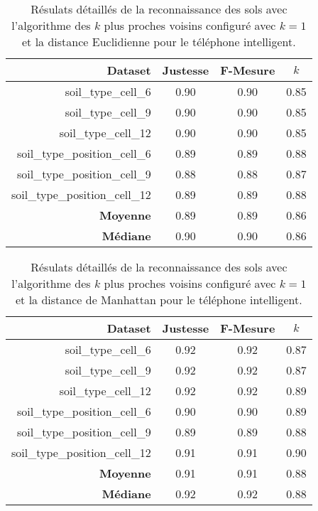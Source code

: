 \begin{table}[H]\renewcommand{\arraystretch}{0.5}
	\centering
	\caption{Résulats détaillés de la reconnaissance des sols avec l'algorithme des $k$ plus proches voisins configuré avec $k=1$ et la distance Euclidienne pour le téléphone intelligent.}
	\label{tab:tab:knn-dE-cell}
	\begin{tabular}{@{}rccc@{}}
		\toprule
			\textbf{Dataset} & \textbf{Justesse} & \textbf{F-Mesure} & \textbf{$k$} \\
		\midrule
			soil\_type\_cell\_6 & 0.90 & 0.90 & 0.85 \\
			soil\_type\_cell\_9 & 0.90 & 0.90 & 0.85 \\
			soil\_type\_cell\_12 & 0.90 & 0.90 & 0.85 \\
			soil\_type\_position\_cell\_6 & 0.89 & 0.89 & 0.88 \\
			soil\_type\_position\_cell\_9 & 0.88 & 0.88 & 0.87 \\
			soil\_type\_position\_cell\_12 & 0.89 & 0.89 & 0.88 \\
			\textbf{Moyenne} & 0.89 & 0.89 & 0.86 \\
			\textbf{Médiane} & 0.90 & 0.90 & 0.86 \\
		\bottomrule
	\end{tabular}
\end{table}

\begin{table}[H]\renewcommand{\arraystretch}{0.5}
	\centering
	\caption{Résulats détaillés de la reconnaissance des sols avec l'algorithme des $k$ plus proches voisins configuré avec $k=1$ et la distance de Manhattan pour le téléphone intelligent.}
	\label{tab:tab:knn-dM-cell}
	\begin{tabular}{@{}rccc@{}}
		\toprule
			\textbf{Dataset} & \textbf{Justesse} & \textbf{F-Mesure} & \textbf{$k$} \\
		\midrule
			soil\_type\_cell\_6 & 0.92 & 0.92 & 0.87 \\
			soil\_type\_cell\_9 & 0.92 & 0.92 & 0.87 \\
			soil\_type\_cell\_12 & 0.92 & 0.92 & 0.89 \\
			soil\_type\_position\_cell\_6 & 0.90 & 0.90 & 0.89 \\
			soil\_type\_position\_cell\_9 & 0.89 & 0.89 & 0.88 \\
			soil\_type\_position\_cell\_12 & 0.91 & 0.91 & 0.90 \\
			\textbf{Moyenne} & 0.91 & 0.91 & 0.88 \\
			\textbf{Médiane} & 0.92 & 0.92 & 0.88 \\
		\bottomrule
	\end{tabular}
\end{table}